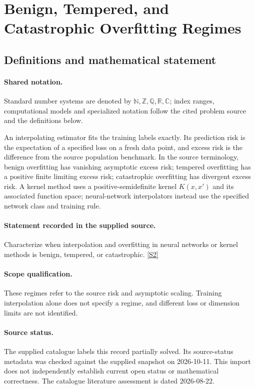 \documentclass[11pt]{article}
\newcommand{\sref}[2]{\hyperlink{source:#1:#2}{[S#2]}}
\begin{document}
\section{Benign, Tempered, and Catastrophic Overfitting Regimes}\label{statement}

\subsection{Definitions and mathematical statement}

\paragraph{Shared notation.}Standard number systems are denoted by $\mathbb N,\mathbb Z,\mathbb Q,\mathbb R,\mathbb C$; index ranges, computational models and specialized notation follow the cited problem source and the definitions below.


An interpolating estimator fits the training labels exactly. Its prediction risk is the expectation of a specified loss on a fresh data point, and excess risk is the difference from the source population benchmark. In the source terminology, benign overfitting has vanishing asymptotic excess risk; tempered overfitting has a positive finite limiting excess risk; catastrophic overfitting has divergent excess risk. A kernel method uses a positive-semidefinite kernel $K(x,x')$ and its associated function space; neural-network interpolators instead use the specified network class and training rule.
\paragraph{Statement recorded in the supplied source.}
Characterize when interpolation and overfitting in neural networks or kernel methods is benign, tempered, or catastrophic. \sref{statement}{2}
\paragraph{Scope qualification.}
These regimes refer to the source risk and asymptotic scaling. Training interpolation alone does not specify a regime, and different loss or dimension limits are not identified.
\paragraph{Source status.}
The supplied catalogue labels this record partially solved. Its source-status metadata was checked against the supplied snapshot on 2026-10-11. This import does not independently establish current open status or mathematical correctness. The catalogue literature assessment is dated 2026-08-22.
\end{document}
